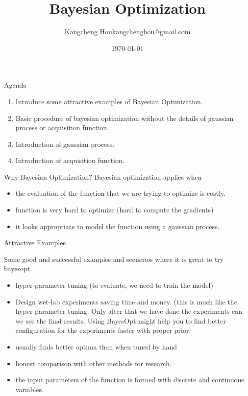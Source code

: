 \documentclass{beamer}
\title{Bayesian Optimization}
\author{\texorpdfstring{Kangcheng Hou\newline\url{kangchenghou@gmail.com}}{Kangcheng Hou}}
\date{\today}
\begin{document}
    
\frame{\titlepage}

\begin{frame}{Agenda}
\begin{enumerate}
\item Introduce some attractive examples of Bayesian Optimization.
\item Basic procedure of bayesian optimization without the details of gaussian process or acquisition function.
\item Introduction of gaussian process.
\item Introduction of acquisition function.
\end{enumerate}
\end{frame}


\begin{frame}{Why Bayesian Optimization?}
Bayesian optimization applies when
\begin{itemize}
\item the evaluation of the function that we are trying to optimize is costly. 
\item function is very hard to optimize (hard to compute the gradients)
\item it looks appropriate to model the function using a gaussian process.
\end{itemize}
\end{frame}

\begin{frame}{Attractive Examples}

Some good and successful examples and scenerios where it is great to try bayesopt.

\begin{itemize}
\item hyper-parameter tuning (to evaluate, we need to train the model)
\item Design wet-lab experiments saving time and money. (this is much like the hyper-parameter tuning. Only after that we have done the experiments can we see the final results. Using BayesOpt might help you to find better configuration for the experiments faster with proper prior.
\item usually finds better optima than when tuned by hand
\item honest comparison with other methods for research.
\item the input parameters of the function is formed with discrete and continuous variables.
\end{itemize}
\end{frame}
\end{document}
